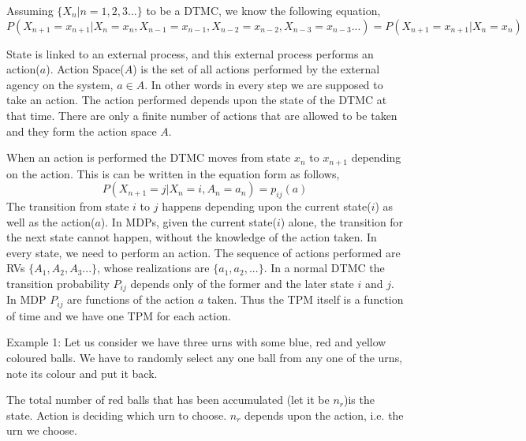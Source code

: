 Assuming $\{X_n|n=1,2,3...\}$ to be a DTMC, we know  the following equation, 
\begin{equation*}
    P(X_{n+1}=x_{n+1}|X_{n}=x_{n},X_{n-1}=x_{n-1},X_{n-2}=x_{n-2},X_{n-3}=x_{n-3}...)=P(X_{n+1}=x_{n+1}|X_{n}=x_{n})
\end{equation*}
 
State is linked to an external process, and this external process performs an action($a$).
Action Space($A$) is the set of all actions performed by the external agency on the system, $a \in A$.
In other words in every step we are supposed to take an action. The action performed depends upon the state of the DTMC at that time. There are only a finite number of actions that are allowed to be taken and they form the action space $A$.

 When an action is performed the DTMC  moves from state $x_n$ to $x_{n+1}$ depending on the action. This is can be written in the equation form as follows, 
\begin{equation*}
    P(X_{n+1}=j|X_{n}=i, A_n=a_n)=p_{ij}(a)
\end{equation*}
The transition from state $i$ to $j$ happens depending upon the current state($i$) as well as the action($a$). In MDPs, given the current state($i$) alone, the transition for the next state cannot happen, without the knowledge of the action taken. In every state, we need to perform an action. The sequence of actions performed are RVs $\{A_1,A_2,A_3...\}$, whose realizations are $\{a_1, a_2,... \}$. In a normal DTMC the transition probability $P_{ij}$ depends only of the former and the later state $i$ and $j$. In MDP $P_{ij}$ are functions of the action $a$ taken. Thus the TPM itself is a function of time and we have one TPM for each action.

Example 1: Let us consider we have three urns with some blue, red and yellow coloured balls. We have to randomly select any one ball from any one of the urns, note its colour and put it back. 

The total number of red balls that has been accumulated (let it be $n_r$)is the state. Action is deciding which urn to choose. $n_r$ depends upon the action, i.e. the urn we choose.

